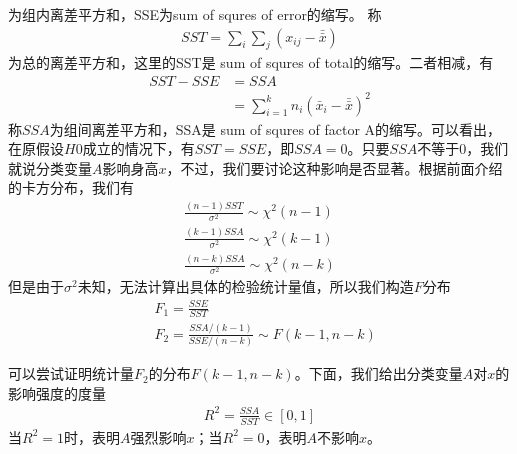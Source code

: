         为组内离差平方和，SSE为sum of squres of error的缩写。
        称
        \begin{align*}
        SST = \sum_i\sum_j(x_{ij} - \bar{\bar{x}})
        \end{align*}
        为总的离差平方和，这里的SST是 sum of squres of total的缩写。二者相减，有
        \begin{align*}
        SST - SSE &= SSA\\
        &=\sum_{i=1}^kn_i(\bar{x}_i - \bar{\bar{x}})^2
        \end{align*}
        称$SSA$为组间离差平方和，SSA是 sum of squres of factor A的缩写。可以看出，在原假设$H0$成立的情况下，有$SST = SSE$，即$SSA = 0$。只要$SSA$不等于$0$，我们就说分类变量$A$影响身高$x$，不过，我们要讨论这种影响是否显著。根据前面介绍的卡方分布，我们有
        \begin{align*}
        \frac{(n-1)SST}{\sigma^2} \sim \chi^2(n-1)\\
        \frac{(k-1)SSA}{\sigma^2} \sim \chi^2(k-1)\\
        \frac{(n-k)SSA}{\sigma^2} \sim \chi^2(n-k)
        \end{align*}
        但是由于$\sigma^2$未知，无法计算出具体的检验统计量值，所以我们构造$F$分布
        \begin{align*}
        &F_1 = \frac{SSE}{SST}\\
        &F_2 = \frac{SSA/(k-1)}{SSE/(n-k)} \sim F(k-1,n-k)
        \end{align*}
        \par
        可以尝试证明统计量$F_2$的分布$F(k-1,n-k)$。下面，我们给出分类变量$A$对$x$的影响强度的度量
        \begin{align*}
        R^2 = \frac{SSA}{SST}\in [0,1]
        \end{align*}
        当$R^2 = 1$时，表明$A$强烈影响$x$；当$R^2 = 0$，表明$A$不影响$x$。

